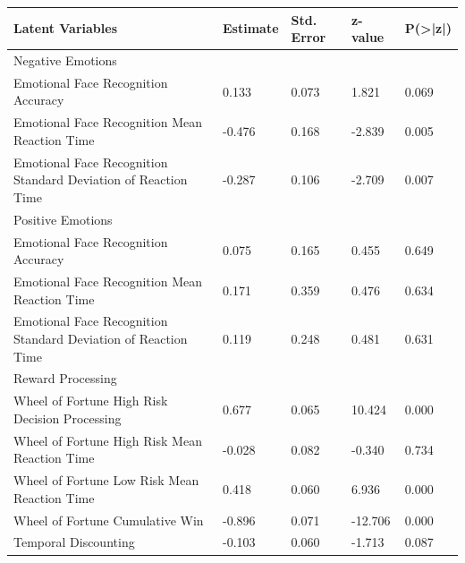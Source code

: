 \documentclass[utf8]{frontiersSCNS} %
\begin{document}
\begin{table}[]
\begin{tabular}{|l|l|l|l|l|}
\hline
Latent Variables                                               & Estimate & Std. Error & z-value & P(\textgreater{}|z|) \\ \hline
Negative Emotions                                              &          &            &         &                      \\ \hline
Emotional Face Recognition Accuracy                            & 0.133    & 0.073      & 1.821   & 0.069                \\ \hline
Emotional Face Recognition Mean Reaction Time                  & -0.476   & 0.168      & -2.839  & 0.005                \\ \hline
Emotional Face Recognition Standard Deviation of Reaction Time & -0.287   & 0.106      & -2.709  & 0.007                \\ \hline
Positive Emotions                                              &          &            &         &                      \\ \hline
Emotional Face Recognition Accuracy                            & 0.075    & 0.165      & 0.455   & 0.649                \\ \hline
Emotional Face Recognition Mean Reaction Time                  & 0.171    & 0.359      & 0.476   & 0.634                \\ \hline
Emotional Face Recognition Standard Deviation of Reaction Time & 0.119    & 0.248      & 0.481   & 0.631                \\ \hline
Reward Processing                                              &          &            &         &                      \\ \hline
Wheel of Fortune High Risk Decision Processing                 & 0.677    & 0.065      & 10.424  & 0.000                \\ \hline
Wheel of Fortune High Risk Mean Reaction Time                  & -0.028   & 0.082      & -0.340  & 0.734                \\ \hline
Wheel of Fortune Low Risk Mean Reaction Time                   & 0.418    & 0.060      & 6.936   & 0.000                \\ \hline
Wheel of Fortune Cumulative Win                                & -0.896   & 0.071      & -12.706 & 0.000                \\ \hline
Temporal Discounting                                           & -0.103   & 0.060      & -1.713  & 0.087                \\ \hline

\end{tabular}
\end{table}
\end{document}
